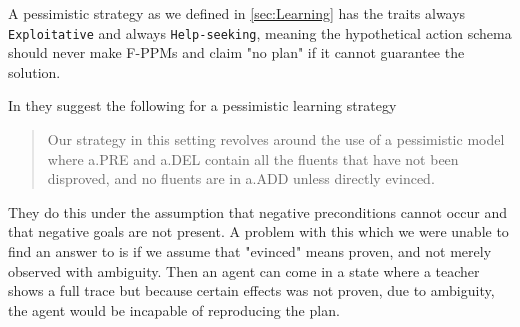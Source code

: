 \documentclass[../Master.tex]{subfiles}
\begin{document}
	A pessimistic strategy as we defined in \ref{sec:Learning} has the traits always \texttt{Exploitative} and always \texttt{Help-seeking},
	meaning the hypothetical action schema should never make F-PPMs and claim "no plan" if it cannot guarantee the solution.

	In \cite{Walsh2008} they suggest the following for a pessimistic learning strategy
	
	\begin{quotation}
		Our strategy in
		this setting revolves around the use of a pessimistic model
		where a.PRE and a.DEL contain all the fluents that have
		not been disproved, and no fluents are in a.ADD unless directly
		evinced.
	\end{quotation}
	 
	They do this under the assumption that negative preconditions cannot occur and that negative goals are not present. 
	A problem with this which we were unable to find an answer to is if we assume that "evinced" means proven, and not merely observed with ambiguity.
	Then an agent can come in a state where a teacher shows a full trace but because certain effects was not proven, due to ambiguity, the agent would be incapable of reproducing the plan.
	
\end{document}

